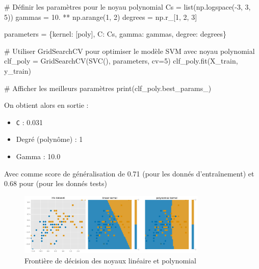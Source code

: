 \documentclass[
  letterpaper,
  DIV=11,
  numbers=noendperiod]{scrartcl}
\newenvironment{Shaded}{\begin{snugshade}}{\end{snugshade}}
\newcommand{\BuiltInTok}[1]{\textcolor[rgb]{0.00,0.23,0.31}{#1}}
\newcommand{\CommentTok}[1]{\textcolor[rgb]{0.37,0.37,0.37}{#1}}
\newcommand{\DecValTok}[1]{\textcolor[rgb]{0.68,0.00,0.00}{#1}}
\newcommand{\FloatTok}[1]{\textcolor[rgb]{0.68,0.00,0.00}{#1}}
\newcommand{\NormalTok}[1]{\textcolor[rgb]{0.00,0.23,0.31}{#1}}
\newcommand{\OperatorTok}[1]{\textcolor[rgb]{0.37,0.37,0.37}{#1}}
\newcommand{\StringTok}[1]{\textcolor[rgb]{0.13,0.47,0.30}{#1}}
\providecommand{\tightlist}{%
  \setlength{\itemsep}{0pt}\setlength{\parskip}{0pt}}\usepackage{longtable,booktabs,array}
\begin{document}
\begin{Shaded}
\begin{Highlighting}[]
\CommentTok{\# Définir les paramètres pour le noyau polynomial}
\NormalTok{Cs }\OperatorTok{=} \BuiltInTok{list}\NormalTok{(np.logspace(}\OperatorTok{{-}}\DecValTok{3}\NormalTok{, }\DecValTok{3}\NormalTok{, }\DecValTok{5}\NormalTok{))}
\NormalTok{gammas }\OperatorTok{=} \FloatTok{10.} \OperatorTok{**}\NormalTok{ np.arange(}\DecValTok{1}\NormalTok{, }\DecValTok{2}\NormalTok{)}
\NormalTok{degrees }\OperatorTok{=}\NormalTok{ np.r\_[}\DecValTok{1}\NormalTok{, }\DecValTok{2}\NormalTok{, }\DecValTok{3}\NormalTok{]}

\NormalTok{parameters }\OperatorTok{=}\NormalTok{ \{}\StringTok{\textquotesingle{}kernel\textquotesingle{}}\NormalTok{: [}\StringTok{\textquotesingle{}poly\textquotesingle{}}\NormalTok{], }\StringTok{\textquotesingle{}C\textquotesingle{}}\NormalTok{: Cs, }\StringTok{\textquotesingle{}gamma\textquotesingle{}}\NormalTok{: gammas, }\StringTok{\textquotesingle{}degree\textquotesingle{}}\NormalTok{: degrees\}}

\CommentTok{\# Utiliser GridSearchCV pour optimiser le modèle SVM avec noyau polynomial}
\NormalTok{clf\_poly }\OperatorTok{=}\NormalTok{ GridSearchCV(SVC(), parameters, cv}\OperatorTok{=}\DecValTok{5}\NormalTok{)}
\NormalTok{clf\_poly.fit(X\_train, y\_train)}

\CommentTok{\# Afficher les meilleurs paramètres}
\BuiltInTok{print}\NormalTok{(clf\_poly.best\_params\_)}
\end{Highlighting}
\end{Shaded}

On obtient alors en sortie :

\begin{itemize}
\tightlist
\item
  \texttt{C} : 0.031
\item
  Degré (polynôme) : 1
\item
  Gamma : 10.0
\end{itemize}

Avec comme score de généralisation de 0.71 (pour les donnés
d'entraînement) et 0.68 pour (pour les donnés tests)

\begin{figure}

{\centering \includegraphics[width=0.8\textwidth,height=\textheight]{tp_files/mediabag/bg.pdf}

}

\caption{Frontière de décision des noyaux linéaire et polynomial}

\end{figure}
\end{document}
